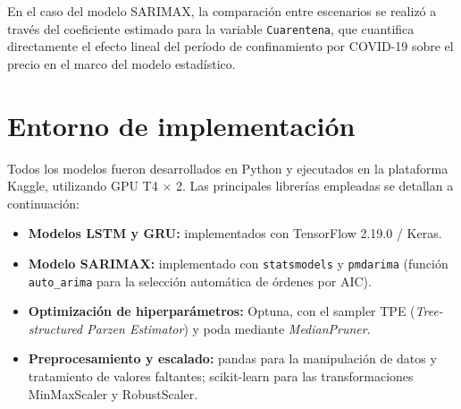 \justify
En el caso del modelo SARIMAX, la comparación entre escenarios se realizó a través del coeficiente estimado para la variable \texttt{Cuarentena}, que cuantifica directamente el efecto lineal del período de confinamiento por COVID-19 sobre el precio en el marco del modelo estadístico.

\section{Entorno de implementación}
\justify
Todos los modelos fueron desarrollados en Python y ejecutados en la plataforma Kaggle, utilizando GPU T4 $\times$ 2. Las principales librerías empleadas se detallan a continuación:

\begin{itemize}
\item \textbf{Modelos LSTM y GRU:} implementados con TensorFlow 2.19.0 / Keras.
\item \textbf{Modelo SARIMAX:} implementado con \texttt{statsmodels} y \texttt{pmdarima} (función \texttt{auto\_arima} para la selección automática de órdenes por AIC).
\item \textbf{Optimización de hiperparámetros:} Optuna, con el sampler TPE (\textit{Tree-structured Parzen Estimator}) y poda mediante \textit{MedianPruner}.
\item \textbf{Preprocesamiento y escalado:} pandas para la manipulación de datos y tratamiento de valores faltantes; scikit-learn para las transformaciones MinMaxScaler y RobustScaler.
\end{itemize}
